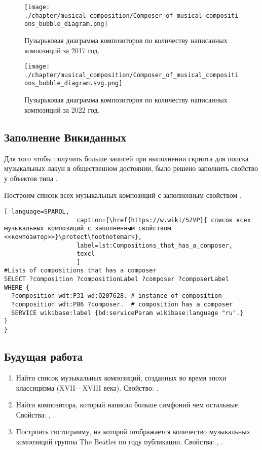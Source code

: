 \begin{figure*}
	\texttt{[image: ./chapter/musical\_composition/Composer\_of\_musical\_compositions\_bubble\_diagram.png]}
	\caption[Пузырьковая диаграмма композиторов по количеству написанных композиций за 2017 год.]{Пузырьковая диаграмма композиторов по количеству написанных композиций за 2017 год.}%
 	\label{fig:bubbleChart}%
\end{figure*}
\begin{figure*}
	\texttt{[image: ./chapter/musical\_composition/Composer\_of\_musical\_compositions\_bubble\_diagram.svg.png]}
	\caption[Пузырьковая диаграмма композиторов по количеству написанных композиций за 2022 год.]{Пузырьковая диаграмма композиторов по количеству написанных композиций за 2022 год.}%
	\label{fig:bubbleChart2}%
\end{figure*}
\newpage


\subsection{Заполнение Викиданных}
Для того чтобы получить больше записей при выполнении скрипта для поиска музыкальных лакун в общественном достоянии, было решено заполнить свойство  у объектов типа .

Построим список всех музыкальных композиций с заполненным свойством .

\begin{lstlisting}[ language=SPARQL,
                    caption={\href{https://w.wiki/52VP}{ список всех музыкальных композиций с заполненным свойством <<композитор>>}\protect\footnotemark},
                    label=lst:Compositions_that_has_a_composer,
                    texcl 
                    ]
#Lists of compositions that has a composer
SELECT ?composition ?compositionLabel ?composer ?composerLabel 
WHERE {
  ?composition wdt:P31 wd:Q207628. # instance of composition
  ?composition wdt:P86 ?composer.  # composition has a composer
  SERVICE wikibase:label {bd:serviceParam wikibase:language "ru".}
}
}
\end{lstlisting}%



\subsection{Будущая работа}
\begin{enumerate}
\item Найти список музыкальных композиций, созданных во время эпохи классицизма (XVII—XVIII века).
Свойство: .
\item Найти композитора, который написал больше симфоний чем остальные.
Свойства: , .
\item Построить гистограмму, на которой отображается количество музыкальных композиций группы The Beatles по году публикации.
Свойства: , .
\end{enumerate}
